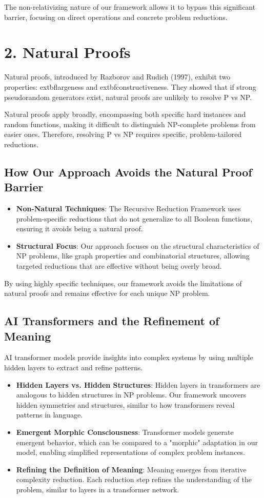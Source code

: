 \documentclass{article}
\begin{document}
The non-relativizing nature of our framework allows it to bypass this significant barrier, focusing on direct operations and concrete problem reductions.

\section*{2. Natural Proofs}
Natural proofs, introduced by Razborov and Rudich (1997), exhibit two properties: 	extbf{largeness} and 	extbf{constructiveness}. They showed that if strong pseudorandom generators exist, natural proofs are unlikely to resolve P vs NP.

Natural proofs apply broadly, encompassing both specific hard instances and random functions, making it difficult to distinguish NP-complete problems from easier ones. Therefore, resolving P vs NP requires specific, problem-tailored reductions.

\subsection*{How Our Approach Avoids the Natural Proof Barrier}
\begin{itemize}
    \item \textbf{Non-Natural Techniques}: The Recursive Reduction Framework uses problem-specific reductions that do not generalize to all Boolean functions, ensuring it avoids being a natural proof.
    \item \textbf{Structural Focus}: Our approach focuses on the structural characteristics of NP problems, like graph properties and combinatorial structures, allowing targeted reductions that are effective without being overly broad.
\end{itemize}

By using highly specific techniques, our framework avoids the limitations of natural proofs and remains effective for each unique NP problem.

\subsection*{AI Transformers and the Refinement of Meaning}
AI transformer models provide insights into complex systems by using multiple hidden layers to extract and refine patterns.

\begin{itemize}
    \item \textbf{Hidden Layers vs. Hidden Structures}: Hidden layers in transformers are analogous to hidden structures in NP problems. Our framework uncovers hidden symmetries and structures, similar to how transformers reveal patterns in language.
    \item \textbf{Emergent Morphic Consciousness}: Transformer models generate emergent behavior, which can be compared to a "morphic" adaptation in our model, enabling simplified representations of complex problem instances.
    \item \textbf{Refining the Definition of Meaning}: Meaning emerges from iterative complexity reduction. Each reduction step refines the understanding of the problem, similar to layers in a transformer network.
\end{itemize}
\end{document}
